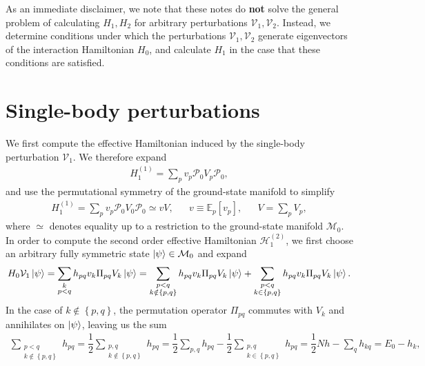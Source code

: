 \documentclass[nofootinbib,notitlepage,11pt]{revtex4-2}
\newcommand{\f}[2]{\dfrac{#1}{#2}} %
\newcommand{\p}[1]{\left(#1\right)} %
\renewcommand{\sp}[1]{\left[#1\right]} %
\renewcommand{\set}[1]{\left\{#1\right\}} %
\newcommand{\1}{\mathds{1}}
\renewcommand{\H}{\mathcal{H}}
\newcommand{\M}{\mathcal{M}}
\renewcommand{\P}{\mathcal{P}}
\newcommand{\V}{\mathcal{V}}
\newcommand{\EE}{\mathbb{E}}
\begin{document}
As an immediate disclaimer, we note that these notes do {\bf not}
solve the general problem of calculating $H_1,H_2$ for arbitrary
perturbations $\V_1,\V_2$.  Instead, we determine conditions under
which the perturbations $\V_1,\V_2$ generate eigenvectors of the
interaction Hamiltonian $H_0$, and calculate $H_1$ in the case that
these conditions are satisfied.

\section{Single-body perturbations}

We first compute the effective Hamiltonian induced by the single-body
perturbation $\V_1$.  We therefore expand
\begin{align}
  H_1^{(1)} = \sum_p v_p \P_0 V_p \P_0,
\end{align}
and use the permutational symmetry of the ground-state manifold to
simplify
\begin{align}
  H_1^{(1)} =  \sum_p v_p \P_0 V_0 \P_0 \simeq v V,
  &&
  v \equiv \EE_p\sp{v_p},
  &&
  V = \sum_p V_p,
  \label{eq:H_1_1}
\end{align}
where $\simeq$ denotes equality up to a restriction to the
ground-state manifold $\M_0$.  In order to compute the second order
effective Hamiltonian $\H_1^{(2)}$, we first choose an arbitrary fully
symmetric state $\ket\psi\in\M_0$ and expand
\begin{align}
  H_0 \V_1 \ket\psi
  = \sum_{\substack{k\\p<q}} h_{pq} v_k \Pi_{pq} V_k \ket\psi
  = \sum_{\substack{p<q\\k\notin\set{p,q}}}
  h_{pq} v_k \Pi_{pq} V_k \ket\psi
  + \sum_{\substack{p<q\\k\in\set{p,q}}}
  h_{pq} v_k \Pi_{pq} V_k \ket\psi.
  \label{eq:H_V1_psi_start}
\end{align}
In the case of $k\notin\set{p,q}$, the permutation operator $\Pi_{pq}$
commutes with $V_k$ and annihilates on $\ket\psi$, leaving us the sum
\begin{align}
  \sum_{\substack{p<q\\k\notin\set{p,q}}} h_{pq}
  = \f12 \sum_{\substack{p,q\\k\notin\set{p,q}}} h_{pq}
  = \f12 \sum_{p,q} h_{pq}
  - \f12 \sum_{\substack{p,q\\k\in\set{p,q}}} h_{pq}
  = \f12 N h - \sum_q h_{kq}
  = E_0 - h_k,
\end{align}
\end{document}
